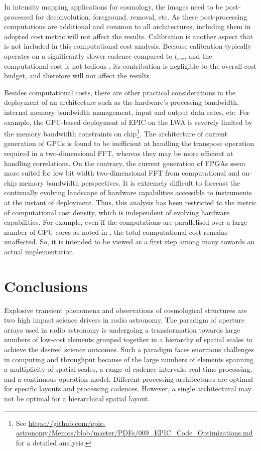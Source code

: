\documentclass[
  journal=pasa,
  manuscript=article-type,
  year=2020,
  volume=37,
]{cup-journal}
\begin{document}
In intensity mapping applications for cosmology, the images need to be post-processed for deconvolution, foreground, removal, etc. As these post-processing computations are additional and common to all architectures, including them in adopted cost metric will not affect the results. Calibration is another aspect that is not included in this computational cost analysis. Because calibration typically operates on a significantly slower cadence compared to $t_\textrm{acc}$, and the computational cost is not tedious \citep{Beardsley+2017,Gorthi+2021}, its contribution is negligible to the overall cost budget, and therefore will not affect the results.

Besides computational costs, there are other practical considerations in the deployment of an architecture such as the hardware's processing bandwidth, internal memory bandwidth management, input and output data rates, etc. For example, the GPU-based deployment of EPIC on the LWA is severely limited by the memory bandwidth constraints on chip\footnote{See \url{https://github.com/epic-astronomy/Memos/blob/master/PDFs/009_EPIC_Code_Optimizations.md} for a detailed analysis.}. The architecture of current generation of GPUs is found to be inefficient at handling the transpose operation required in a two-dimensional FFT, whereas they may be more efficient at handling correlations. On the contrary, the current generation of FPGAs seem more suited for low bit width two-dimensional FFT from computational and on-chip memory bandwidth perspectives. It is extremely difficult to forecast the continually evolving landscape of hardware capabilities accessible to instruments at the instant of deployment. Thus, this analysis has been restricted to the metric of computational cost density, which is independent of evolving hardware capabilities. For example, even if the computations are parallelised over a large number of GPU cores as noted in \citet{Sokolowski+2024}, the total computational cost remains unaffected. So, it is intended to be viewed as a first step among many towards an actual implementation. 

\section{Conclusions} \label{sec:conclusion}

Explosive transient phenomena and observations of cosmological structures are two high impact science drivers in radio astronomy. The paradigm of aperture arrays used in radio astronomy is undergoing a transformation towards large numbers of low-cost elements grouped together in a hierarchy of spatial scales to achieve the desired science outcomes. Such a paradigm faces enormous challenges in computing and throughput because of the large numbers of elements spanning a multiplicity of spatial scales, a range of cadence intervals, real-time processing, and a continuous operation model. Different processing architectures are optimal for specific layouts and processing cadences. However, a single architectural may not be optimal for a hierarchical spatial layout.
\end{document}
